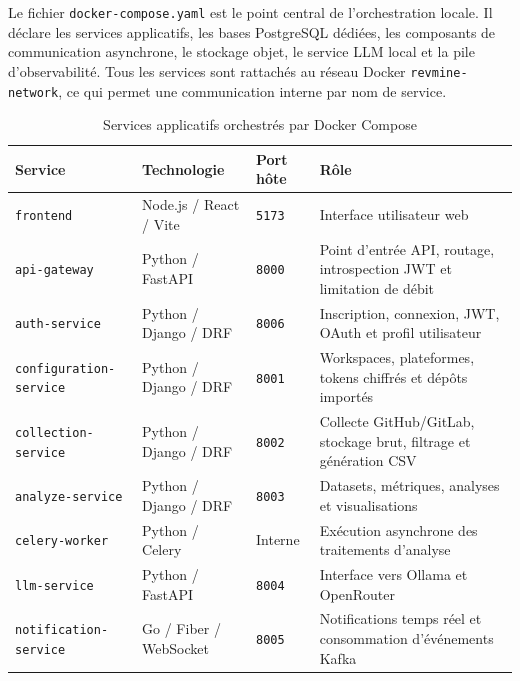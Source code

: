 Le fichier \texttt{docker-compose.yaml} est le point central de l'orchestration locale. Il
déclare les services applicatifs, les bases PostgreSQL dédiées, les composants de communication
asynchrone, le stockage objet, le service LLM local et la pile d'observabilité. Tous les services
sont rattachés au réseau Docker \texttt{revmine-network}, ce qui permet une communication interne
par nom de service.

\begin{table}[H]
\centering
\scriptsize
\caption{Services applicatifs orchestrés par Docker Compose}
\label{tab:docker-services-app}
\begin{tabular}{|>{\raggedright\arraybackslash}p{3.2cm}
                |>{\raggedright\arraybackslash}p{3.3cm}
                |>{\raggedright\arraybackslash}p{2cm}
                |>{\raggedright\arraybackslash}p{4.4cm}|}
\hline
\textbf{Service} & \textbf{Technologie} & \textbf{Port hôte} & \textbf{Rôle} \\
\hline
\texttt{frontend} & Node.js / React / Vite & \texttt{5173} & Interface utilisateur web \\
\hline
\texttt{api-gateway} & Python / FastAPI & \texttt{8000} & Point d'entrée API, routage, introspection JWT et limitation de débit \\
\hline
\texttt{auth-service} & Python / Django / DRF & \texttt{8006} & Inscription, connexion, JWT, OAuth et profil utilisateur \\
\hline
\texttt{configuration-service} & Python / Django / DRF & \texttt{8001} & Workspaces, plateformes, tokens chiffrés et dépôts importés \\
\hline
\texttt{collection-service} & Python / Django / DRF & \texttt{8002} & Collecte GitHub/GitLab, stockage brut, filtrage et génération CSV \\
\hline
\texttt{analyze-service} & Python / Django / DRF & \texttt{8003} & Datasets, métriques, analyses et visualisations \\
\hline
\texttt{celery-worker} & Python / Celery & Interne & Exécution asynchrone des traitements d'analyse \\
\hline
\texttt{llm-service} & Python / FastAPI & \texttt{8004} & Interface vers Ollama et OpenRouter \\
\hline
\texttt{notification-service} & Go / Fiber / WebSocket & \texttt{8005} & Notifications temps réel et consommation d'événements Kafka \\
\hline
\end{tabular}
\end{table}

